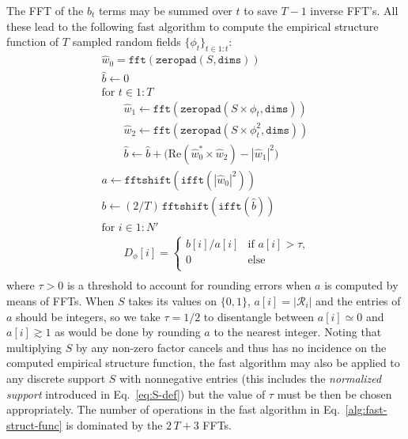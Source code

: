 \documentclass{article}
\renewcommand*{\Re}{\mathrm{Re}}
\begin{document}
The FFT of the $b_{t}$ terms may be summed over $t$ to save $T - 1$ inverse
FFT's. All these lead to the following fast algorithm to compute the empirical
structure function of $T$ sampled random fields $\{\phi_{t}\}_{t\in1:t}$:
\begin{equation}
  \label{alg:fast-struct-func}
  \begin{array}{l}
    \widehat{w}_{0} = \mathtt{fft}(\mathtt{zeropad}(S, \mathtt{dims}))\\
    \widehat{b} \gets 0\\
    \text{for $t \in 1:T$}\\
    \qquad \widehat{w}_{1} \gets
    \mathtt{fft}(\mathtt{zeropad}(S \times \phi_{t}, \mathtt{dims}))\\
    \qquad \widehat{w}_{2} \gets
    \mathtt{fft}(\mathtt{zeropad}(S \times \phi_{t}^{2}, \mathtt{dims}))\\
    \qquad \widehat{b} \gets \widehat{b} +\bigl(
    \Re(\widehat{w}_{0}^{*} \times \widehat{w}_{2})
    - |\widehat{w}_{1}|^{2}\bigr) \\
    a \gets \mathtt{fftshift}(\mathtt{ifft}(|\widehat{w}_{0}|^{2}))\\
    b \gets (2/T)\,\mathtt{fftshift}(\mathtt{ifft}(\widehat{b}))\\
    \text{for $i \in 1:N'$}\\
    \qquad D_{\phi}[i] = \begin{cases}
       b[i]/a[i] & \text{if $a[i] > \tau$,}\\
       0 & \text{else}\\
     \end{cases}\\
  \end{array}
\end{equation}
where $\tau > 0$ is a threshold to account for rounding errors when $a$ is
computed by means of FFTs. When $S$ takes its values on $\{0,1\}$,
$a[i] = |\mathcal{R}_{i}|$ and the entries of $a$ should be integers, so we
take $\tau = 1/2$ to disentangle between $a[i] \simeq 0$ and $a[i] \gtrsim 1$
as would be done by rounding $a$ to the nearest integer. Noting that
multiplying $S$ by any non-zero factor cancels and thus has no incidence on the
computed empirical structure function, the fast algorithm may also be applied
to any discrete support $S$ with nonnegative entries (this includes the
\emph{normalized support} introduced in Eq.~\eqref{eq:S-def}) but the value of
$\tau$ must be then be chosen appropriately. The number of operations in the
fast algorithm in Eq.~\eqref{alg:fast-struct-func} is dominated by the
$2\,T + 3$ FFTs.
\end{document}
